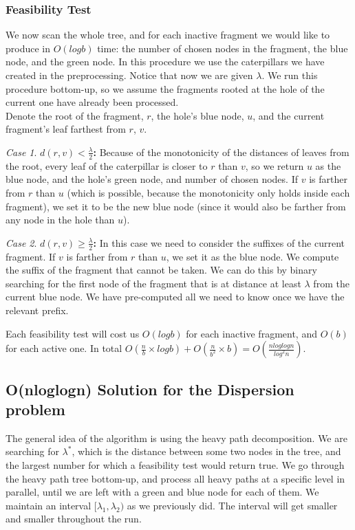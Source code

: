 \documentclass[11pt,a4paper]{article}
\theoremstyle{definition}
\theoremstyle{remark}
\newtheorem{case}{Case}
\begin{document}
\subsubsection{Feasibility Test}
We now scan the whole tree, and for each inactive fragment we would like to produce in $O(logb)$ time: the number of chosen nodes in the fragment, the blue node, and the green node. In this procedure we use the caterpillars we have created in the preprocessing. Notice that now we are given $\lambda$.
We run this procedure bottom-up, so we assume the fragments rooted at the hole of the current one have already been processed.\\
Denote the root of the fragment, $r$, the hole's blue node, $u$, and the current fragment's leaf farthest from $r$, $v$.\\
\begin{case}
\textbf{$d(r,v) < \frac{\lambda}{2}$:} Because of the monotonicity of the distances of leaves from the root, every leaf of the caterpillar is closer to $r$ than $v$, so we return $u$ as the blue node, and the hole's green node, and number of chosen nodes. If $v$ is farther from $r$ than $u$ (which is possible, because the monotonicity only holds inside each fragment), we set it to be the new blue node (since it would also be farther from any node in the hole than $u$).
\end{case}
\begin{case}
\textbf{$d(r,v) \geq \frac{\lambda}{2}$:}
In this case we need to consider the suffixes of the current fragment. If $v$ is farther from $r$ than $u$, we set it as the blue node. We compute the suffix of the fragment that cannot be taken. We can do this by binary searching for the first node of the fragment that is at distance at least $\lambda$ from the current blue node. We have pre-computed all we need to know once we have the relevant prefix.
\end{case}
Each feasibility test will cost us $O(logb)$ for each inactive fragment, and $O(b)$ for each active one. In total $O(\frac{n}{b} \times logb) + O(\frac{n}{b^2} \times b) = O(\frac{nloglogn}{log^2n})$.


\subsection{O(nloglogn) Solution for the Dispersion problem}
The general idea of the algorithm is using the heavy path decomposition. We are searching for $\lambda^*$, which is the distance between some two nodes in the tree, and the largest number for which a feasibility test would return true.
We go through the heavy path tree bottom-up, and process all heavy paths at a specific level in parallel, until we are left with a green and blue node for each of them. We maintain an interval $[\lambda_1,\lambda_2)$ as we previously did. The interval will get smaller and smaller throughout the run.
\end{document}
